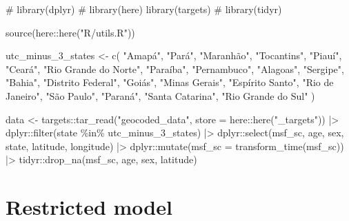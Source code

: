 \documentclass[
  12pt,
  a4paper,
  oneside]{tesesusp}
\newenvironment{Shaded}{\begin{snugshade}}{\end{snugshade}}
\newcommand{\AttributeTok}[1]{\textcolor[rgb]{0.40,0.45,0.13}{#1}}
\newcommand{\CommentTok}[1]{\textcolor[rgb]{0.37,0.37,0.37}{#1}}
\newcommand{\FunctionTok}[1]{\textcolor[rgb]{0.28,0.35,0.67}{#1}}
\newcommand{\NormalTok}[1]{\textcolor[rgb]{0.00,0.23,0.31}{#1}}
\newcommand{\OtherTok}[1]{\textcolor[rgb]{0.00,0.23,0.31}{#1}}
\newcommand{\SpecialCharTok}[1]{\textcolor[rgb]{0.37,0.37,0.37}{#1}}
\newcommand{\StringTok}[1]{\textcolor[rgb]{0.13,0.47,0.30}{#1}}
\begin{document}
\begin{Shaded}
\begin{Highlighting}[numbers=left,,]
\CommentTok{\# library(dplyr)}
\CommentTok{\# library(here)}
\FunctionTok{library}\NormalTok{(targets)}
\CommentTok{\# library(tidyr)}

\FunctionTok{source}\NormalTok{(here}\SpecialCharTok{::}\FunctionTok{here}\NormalTok{(}\StringTok{"R/utils.R"}\NormalTok{))}

\NormalTok{utc\_minus\_3\_states }\OtherTok{\textless{}{-}} \FunctionTok{c}\NormalTok{(}
  \StringTok{"Amapá"}\NormalTok{, }\StringTok{"Pará"}\NormalTok{, }\StringTok{"Maranhão"}\NormalTok{, }\StringTok{"Tocantins"}\NormalTok{, }\StringTok{"Piauí"}\NormalTok{, }\StringTok{"Ceará"}\NormalTok{,}
  \StringTok{"Rio Grande do Norte"}\NormalTok{, }\StringTok{"Paraíba"}\NormalTok{, }\StringTok{"Pernambuco"}\NormalTok{, }\StringTok{"Alagoas"}\NormalTok{, }\StringTok{"Sergipe"}\NormalTok{,}
  \StringTok{"Bahia"}\NormalTok{, }\StringTok{"Distrito Federal"}\NormalTok{, }\StringTok{"Goiás"}\NormalTok{, }\StringTok{"Minas Gerais"}\NormalTok{, }\StringTok{"Espírito Santo"}\NormalTok{,}
  \StringTok{"Rio de Janeiro"}\NormalTok{, }\StringTok{"São Paulo"}\NormalTok{, }\StringTok{"Paraná"}\NormalTok{, }\StringTok{"Santa Catarina"}\NormalTok{,}
  \StringTok{"Rio Grande do Sul"}
\NormalTok{)}

\NormalTok{data }\OtherTok{\textless{}{-}} 
\NormalTok{  targets}\SpecialCharTok{::}\FunctionTok{tar\_read}\NormalTok{(}\StringTok{"geocoded\_data"}\NormalTok{, }\AttributeTok{store =}\NormalTok{ here}\SpecialCharTok{::}\FunctionTok{here}\NormalTok{(}\StringTok{"\_targets"}\NormalTok{)) }\SpecialCharTok{|\textgreater{}}
\NormalTok{  dplyr}\SpecialCharTok{::}\FunctionTok{filter}\NormalTok{(state }\SpecialCharTok{\%in\%}\NormalTok{ utc\_minus\_3\_states) }\SpecialCharTok{|\textgreater{}}
\NormalTok{  dplyr}\SpecialCharTok{::}\FunctionTok{select}\NormalTok{(msf\_sc, age, sex, state, latitude, longitude) }\SpecialCharTok{|\textgreater{}}
\NormalTok{  dplyr}\SpecialCharTok{::}\FunctionTok{mutate}\NormalTok{(}\AttributeTok{msf\_sc =} \FunctionTok{transform\_time}\NormalTok{(msf\_sc)) }\SpecialCharTok{|\textgreater{}}
\NormalTok{  tidyr}\SpecialCharTok{::}\FunctionTok{drop\_na}\NormalTok{(msf\_sc, age, sex, latitude)}
\end{Highlighting}
\end{Shaded}

\hypertarget{restricted-model}{%
\section{Restricted model}\label{restricted-model}}
\end{document}
